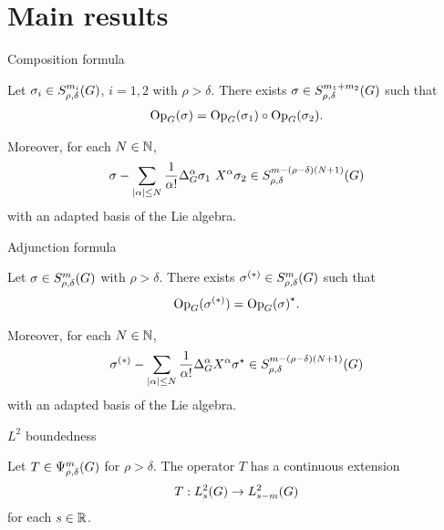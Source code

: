 \documentclass{beamer}
\begin{document}
\section{Main results}

\begin{frame}{Composition formula}
    \begin{theorem}
        Let $\sigma_i \in S^{m_i}_{\rho, \delta}(G)$, $i = 1, 2$ with $\rho > \delta$.
        There exists $\sigma \in S^{m_1 + m_2}_{\rho, \delta}(G)$ such that
        \begin{align*}
            \mathrm{Op}_{G}(\sigma) = \mathrm{Op}_{G}(\sigma_1) \circ \mathrm{Op}_{G}(\sigma_2).
        \end{align*}

        Moreover,
        for each $N \in \mathbb{N}$,
        \begin{align*}
            \sigma - \sum_{\abs \alpha \leq N} \frac 1 {\alpha!} \DifferenceOperatorOrder {\alpha} \sigma_1 \ \LeftDifferentialOperator {\alpha} \sigma_2 \in \SymbolClass {m - (\rho - \delta) (N + 1)} {\rho, \delta}
        \end{align*}
        with an adapted basis of the Lie algebra.
    \end{theorem}
\end{frame}

\begin{frame}{Adjunction formula}
    \begin{theorem}
        Let $\sigma \in S^{m}_{\rho, \delta}(G)$ with $\rho > \delta$.
        There exists $\sigma^{(*)} \in S^{m}_{\rho, \delta}(G)$ such that
        \begin{align*}
            \mathrm{Op}_{G}(\sigma^{(*)}) = {\mathrm{Op}_{G}(\sigma)}^\star.
        \end{align*}

        Moreover,
        for each $N \in \mathbb{N}$,
        \begin{align*}
            \sigma^{(*)} - \sum_{\abs \alpha \leq N} \frac 1 {\alpha!} \DifferenceOperatorOrder {\alpha} \LeftDifferentialOperator {\alpha} \adj \sigma \in \SymbolClass {m - (\rho - \delta) (N + 1)} {\rho, \delta}
        \end{align*}
        with an adapted basis of the Lie algebra.
    \end{theorem}
\end{frame}

\begin{frame}{$L^2$ boundedness}
    \begin{theorem}[$L^2$ boundedness]
        Let $T \in \Psi^{m}_{\rho, \delta}(G)$ for $\rho > \delta$.
        The operator $T$ has a continuous extension
        \begin{align*}
            T : L^2_{s}(G) \to L^2_{s - m}(G)
        \end{align*}
        for each $s \in \mathbb{R}$.
    \end{theorem}
\end{frame}
\end{document}
